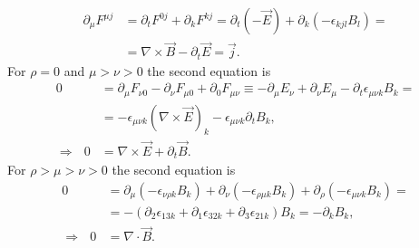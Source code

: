 \documentclass[english, parskip=full]{scrartcl}
\newcommand{\kla}{}
\begin{document}
\begin{align}
\partial_\mu F^{\mu j} &= \partial_t F^{0j} + \partial_k F^{kj} = \partial_t \kla\left( -\vec{E} \right) + \partial_k \kla\left( -\epsilon_{kjl}B_l \right) = \\
&= \nabla\times\vec{B} - \partial_t\vec{E} = \vec{j}.
\end{align}
For $\rho=0$ and $\mu>\nu > 0$ the second equation is
\begin{align}
0 &= \partial_\mu F_{\nu 0} - \partial_\nu F_{\mu 0} + \partial_0 F_{\mu \nu} \equiv -\partial_\mu E_\nu + \partial_\nu E_\mu - \partial_t \epsilon_{\mu\nu k}B_k = \\
&= -\epsilon_{\mu\nu k} (\nabla\times \vec{E})_k - \epsilon_{\mu\nu k}\partial_t B_k,\\
\Rightarrow\ \ \ 0 &= \nabla\times\vec{E} + \partial_t\vec{B}.
\end{align}
For $\rho>\mu>\nu> 0$ the second equation is
\begin{align}
0 &= \partial_\mu \kla\left( -\epsilon_{\nu\rho k}B_k \right) + \partial_\nu \kla\left( -\epsilon_{\rho\mu k}B_k \right) + \partial_\rho \kla\left( -\epsilon_{\mu\nu k} B_k \right) = \\
&= -\kla\left( \partial_2\epsilon_{13k} + \partial_1\epsilon_{32k} + \partial_3\epsilon_{21k} \right) B_k = -\partial_k B_k,\\
\Rightarrow\ \ \ 0 &= \nabla\cdot\vec{B}.
\end{align}



\end{document}
